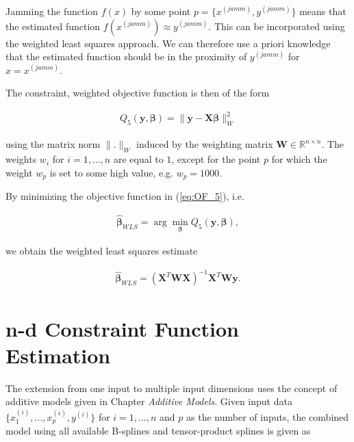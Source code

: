 \documentclass[10pt,a4paper]{article}
\begin{document}
	Jamming the function $f(x)$ by some point $p = \{x^{(jamm)}, y^{(jamm)}\}$ means that the estimated function $f(x^{(jamm)}) \approx y^{(jamm)}$. This can be incorporated using the weighted least squares approach. \cite{strutz2016data} We can therefore use a priori knowledge that the estimated function should be in the proximity of $y^{(jamm)}$ for $x = x^{(jamm)}$. 
	
	The constraint, weighted objective function is then of the form
	
	\begin{align}\label{eq:OF_5}
		Q_5(\boldsymbol{y}, \boldsymbol{\beta}) = \lVert \boldsymbol{y} - \boldsymbol{X}\boldsymbol{\beta} \rVert^2_W
	\end{align}
	
	using the matrix norm $\lVert .\rVert_W$ induced by the weighting matrix $\boldsymbol{W} \in \mathbb{R}^{n \times n}$. The weights $w_i$ for $i=1, \dots, n$ are equal to $1$, except for the point $p$ for which the weight $w_p$ is set to some high value, e.g. $w_p = 1000$.
	
	By minimizing the objective function in (\ref{eq:OF_5}), i.e.
	
	\begin{align}\label{eq:optimization_problem_5}
		\boldsymbol{\hat \beta}_{WLS} = \arg \min_{\boldsymbol{\beta}} Q_5(\boldsymbol{y}, \boldsymbol{\beta}),
	\end{align}

	we obtain the weighted least squares estimate
	
	\begin{align} \label{eq:WLS_coef}
	\boldsymbol{\hat \beta}_{WLS} = (\boldsymbol{X}^T \boldsymbol{W} \boldsymbol{X})^{-1} \boldsymbol{X}^T \boldsymbol{W} \boldsymbol{y}.
	\end{align}	

	\section{n-d Constraint Function Estimation}
	
	The extension from one input to multiple input dimensions uses the concept of additive models given in Chapter \emph{Additive Models}. Given input data $\{ x_1^{(i)}, \dots, x_p^{(i)}, y^{(i)}\}$ for $i = 1, \dots, n$ and $p$ as the number of inputs, the combined model using all available B-splines and tensor-product splines is given as
	
\end{document}

